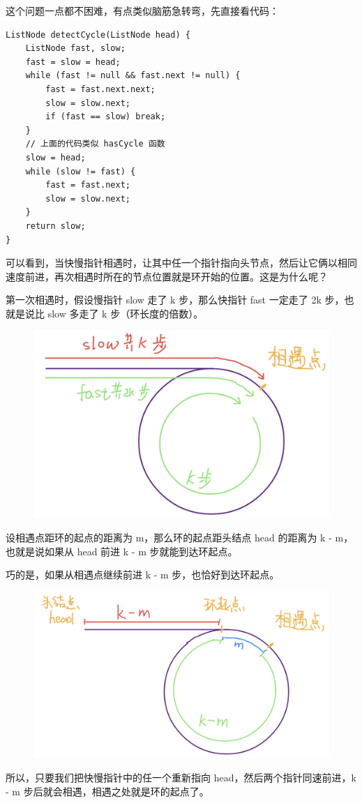 \documentclass[12pt]{article}
\begin{document}
这个问题一点都不困难，有点类似脑筋急转弯，先直接看代码：
\begin{lstlisting}
ListNode detectCycle(ListNode head) {
    ListNode fast, slow;
    fast = slow = head;
    while (fast != null && fast.next != null) {
        fast = fast.next.next;
        slow = slow.next;
        if (fast == slow) break;
    }
    // 上面的代码类似 hasCycle 函数
    slow = head;
    while (slow != fast) {
        fast = fast.next;
        slow = slow.next;
    }
    return slow;
}
\end{lstlisting}

可以看到，当快慢指针相遇时，让其中任一个指针指向头节点，然后让它俩以相同速度前进，再次相遇时所在的节点位置就是环开始的位置。这是为什么呢？

第一次相遇时，假设慢指针 slow 走了 k 步，那么快指针 fast 一定走了 2k 步，也就是说比 slow 多走了 k 步（环长度的倍数）。
\begin{figure}[H]
    \centering
    \includegraphics[width=.6\textwidth]{fig/Double_Pointers_2.png}
\end{figure}

设相遇点距环的起点的距离为 m，那么环的起点距头结点 head 的距离为 k - m，也就是说如果从 head 前进 k - m 步就能到达环起点。

巧的是，如果从相遇点继续前进 k - m 步，也恰好到达环起点。
\begin{figure}[H]
    \centering
    \includegraphics[width=.6\textwidth]{fig/Double_Pointers_3.png}
\end{figure}

所以，只要我们把快慢指针中的任一个重新指向 head，然后两个指针同速前进，k - m 步后就会相遇，相遇之处就是环的起点了。
\end{document}
